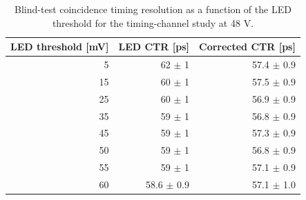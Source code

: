 \begin{table}[htbp]
\centering
\small
\begin{tabular}{rrr}
\toprule
LED threshold [mV] & LED CTR [ps] & Corrected CTR [ps] \\
\midrule
5 & 62 $\pm$ 1 & 57.4 $\pm$ 0.9 \\
15 & 60 $\pm$ 1 & 57.5 $\pm$ 0.9 \\
25 & 60 $\pm$ 1 & 56.9 $\pm$ 0.9 \\
35 & 59 $\pm$ 1 & 56.8 $\pm$ 0.9 \\
45 & 59 $\pm$ 1 & 57.3 $\pm$ 0.9 \\
50 & 59 $\pm$ 1 & 56.8 $\pm$ 0.9 \\
55 & 59 $\pm$ 1 & 57.1 $\pm$ 0.9 \\
60 & 58.6 $\pm$ 0.9 & 57.1 $\pm$ 1.0 \\
\bottomrule
\end{tabular}
\caption{Blind-test coincidence timing resolution as a function of the LED threshold for the timing-channel study at 48 V.}
\label{tab:uc-timing-threshold-scan}
\end{table}
